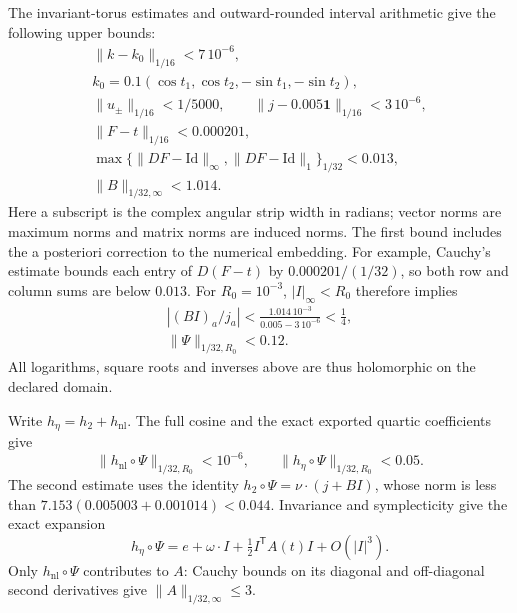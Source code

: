 The invariant-torus estimates and outward-rounded interval arithmetic
give the following upper bounds:
\begin{equation}
 \begin{gathered}
 \|k-k_0\|_{1/16}<7\,10^{-6},\\
 k_0=0.1(\cos t_1,\cos t_2,-\sin t_1,-\sin t_2),\\
 \|u_\pm\|_{1/16}<1/5000,\qquad
 \|j-0.005\mathbf1\|_{1/16}<3\,10^{-6},\\
 \|F-t\|_{1/16}<0.000201,\\
 \max\{\|DF-\mathrm{Id}\|_\infty,
             \|DF-\mathrm{Id}\|_1\}_{1/32}<0.013,\\
 \|B\|_{1/32,\infty}<1.014.
 \end{gathered}
 \label{eq:measure-chart-bounds}
\end{equation}
Here a subscript is the complex angular strip width in radians;
vector norms are maximum norms and matrix norms are induced norms.
The first bound includes the a posteriori correction to the numerical
embedding. For example, Cauchy's estimate bounds each entry of
$D(F-t)$ by $0.000201/(1/32)$, so both row and column sums are below
$0.013$. For $R_0=10^{-3}$, $|I|_\infty<R_0$ therefore implies
\[
 \begin{gathered}
 |(BI)_a/j_a|<\frac{1.014\,10^{-3}}{0.005-3\,10^{-6}}<\tfrac14,
 \\ \|\Psi\|_{1/32,R_0}<0.12.
 \end{gathered}
\]
All logarithms, square roots and inverses above are thus holomorphic
on the declared domain.

Write $h_\eta=h_2+h_{\mathrm{nl}}$. The full cosine and the exact
exported quartic coefficients give
\begin{equation}
 \|h_{\mathrm{nl}}\circ\Psi\|_{1/32,R_0}<10^{-6},\qquad
 \|h_\eta\circ\Psi\|_{1/32,R_0}<0.05.
 \label{eq:measure-chart-hamiltonian-bounds}
\end{equation}
The second estimate uses the identity $h_2\circ\Psi=\nu\cdot(j+BI)$,
whose norm is less than $7.153(0.005003+0.001014)<0.044$.
Invariance and symplecticity give the exact expansion
\begin{equation}
 h_\eta\circ\Psi=e+\omega\cdot I
                 +\tfrac12 I^\mathsf T A(t)I+O(|I|^3).
 \label{eq:measure-tube-hamiltonian}
\end{equation}
Only $h_{\mathrm{nl}}\circ\Psi$ contributes to $A$: Cauchy bounds
on its diagonal and off-diagonal second derivatives give
$\|A\|_{1/32,\infty}\leq3$.

